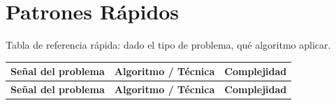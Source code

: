 \documentclass[10pt,a4paper]{article}
\begin{document}
\section{Patrones R\'apidos}

Tabla de referencia r\'apida: dado el tipo de problema, qu\'e algoritmo aplicar.

\vspace{4pt}

\begin{center}
\small
\begin{longtable}{|p{6.5cm}|p{6.5cm}|p{3cm}|}
\hline
\textbf{Se\~nal del problema} & \textbf{Algoritmo / T\'ecnica} & \textbf{Complejidad} \\
\hline\hline
\endfirsthead
\hline
\textbf{Se\~nal del problema} & \textbf{Algoritmo / T\'ecnica} & \textbf{Complejidad} \\
\hline\hline
\endhead


\end{longtable}
\end{center}
\end{document}
